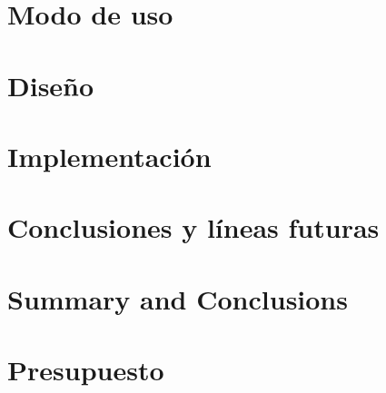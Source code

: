 \documentclass[spanish,a4paper,12pt,oneside]{extreport}
\begin{document}
\chapter{\LARGE Modo de uso}
\label{chapter:modo-de-uso}


\newpage{\pagestyle{empty}}
\thispagestyle{empty}

\chapter{\LARGE Diseño}
\label{chapter:tres}



\newpage{\pagestyle{empty}}
\thispagestyle{empty}

\chapter{\LARGE Implementación}
\label{chapter:cuatro}



\newpage{\pagestyle{empty}}
\thispagestyle{empty}

\chapter{\LARGE Conclusiones y líneas futuras}
\label{chapter:Resultados}



\newpage{\pagestyle{empty}}
\thispagestyle{empty}

\chapter{\LARGE Summary and Conclusions}
\label{chapter:Conclusiones}



\newpage{\pagestyle{empty}}
\thispagestyle{empty}

\chapter{\LARGE Presupuesto}
\label{chapter:presupuesto}
\end{document}
